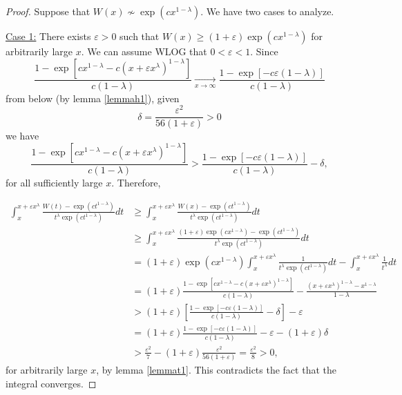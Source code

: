 \documentclass[11pt]{amsart}
\numberwithin{equation}{section}
\newcommand{\difrac}{\displaystyle \frac}
\begin{document}
\begin{proof} Suppose that $W(x) \not \sim \exp(cx^{1 - \lambda})$. We have two cases to analyze.

\noindent \underline{Case 1:} There exists $\varepsilon > 0$ such that $W(x) \geq (1 + \varepsilon)\exp(cx^{1 - \lambda})$ for arbitrarily large $x$. We can assume WLOG that $0 < \varepsilon < 1$. Since $$\difrac{1 - \exp[cx^{1 - \lambda} - c(x + \varepsilon x^\lambda)^{1 - \lambda}]}{c(1 - \lambda)} \xrightarrow[x \to \infty]{} \difrac{1 - \exp[-c\varepsilon (1 - \lambda)]}{c(1 - \lambda)}$$ from below (by lemma \ref{lemmah1}), given $$\delta = \difrac{\varepsilon^2}{56(1 + \varepsilon)} > 0$$ we have $$\difrac{1 - \exp[cx^{1 - \lambda} - c(x + \varepsilon x^\lambda)^{1 - \lambda}]}{c(1 - \lambda)} > \difrac{1 - \exp[-c\varepsilon (1 - \lambda)]}{c(1 - \lambda)} - \delta,$$ for all sufficiently large $x$. Therefore,

\begin{equation*} \begin{split} \int_{x}^{x + \varepsilon x^\lambda} \difrac{W(t) - \exp(ct^{1 - \lambda})}{t^\lambda \exp(ct^{1 - \lambda})} dt & \geq \int_{x}^{x + \varepsilon x^\lambda} \difrac{W(x) - \exp(ct^{1 - \lambda})}{t^\lambda \exp(ct^{1 - \lambda})} dt \\ & \geq \int_{x}^{x + \varepsilon x^\lambda} \difrac{(1 + \varepsilon)\exp(cx^{1 - \lambda}) - \exp(ct^{1 - \lambda})}{t^\lambda \exp(ct^{1 - \lambda})} dt \\ & = (1 + \varepsilon) \exp(cx^{1 - \lambda}) \int_{x}^{x + \varepsilon x^\lambda} \difrac{1}{t^\lambda \exp(ct^{1 - \lambda})} dt - \int_{x}^{x + \varepsilon x^\lambda} \difrac{1}{t^\lambda} dt \\ & = (1 + \varepsilon) \difrac{1 - \exp[cx^{1 - \lambda} - c(x + \varepsilon x^{\lambda})^{1 - \lambda}]}{c(1 - \lambda)} - \difrac{(x + \varepsilon x^{\lambda})^{1 - \lambda} - x^{1 - \lambda}}{1 - \lambda}\\ & > (1 + \varepsilon) \left[\difrac{1 - \exp[-c\varepsilon (1 - \lambda)]}{c(1 - \lambda)} - \delta\right] - \varepsilon \\ & = (1 + \varepsilon) \difrac{1 - \exp[-c\varepsilon (1 - \lambda)]}{c(1 - \lambda)} - \varepsilon - (1 + \varepsilon) \delta \\ & > \difrac{\varepsilon^2}{7} - (1 + \varepsilon) \difrac{\varepsilon^2}{56(1 + \varepsilon)} = \difrac{\varepsilon^2}{8} > 0, \end{split} \end{equation*} for arbitrarily large $x$, by lemma \ref{lemmat1}. This contradicts the fact that the integral converges.


\end{proof}
\end{document}
